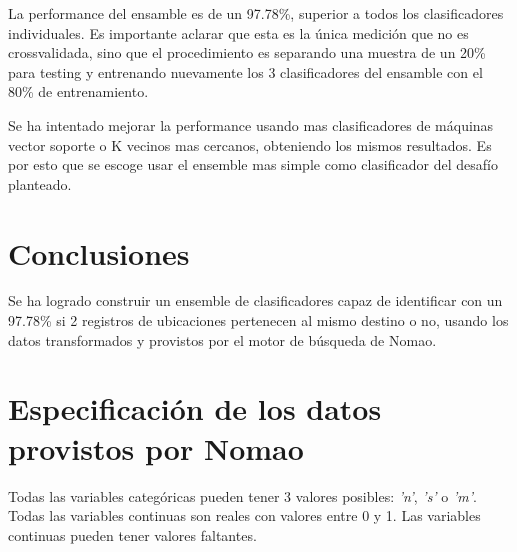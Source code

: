 \documentclass[journal]{IEEEtran}
\begin{document}
La performance del ensamble es de un 97.78\%, superior a todos los
clasificadores individuales. Es importante aclarar
que esta es la única medición que no es crossvalidada, sino que el 
procedimiento es separando una muestra de un 20\% para testing y
entrenando nuevamente los 3 clasificadores del ensamble con el 80\%
de entrenamiento.

Se ha intentado mejorar la performance usando mas clasificadores de
máquinas vector soporte o K vecinos mas cercanos, obteniendo los
mismos resultados. Es por esto que se escoge usar el ensemble
mas simple como clasificador del desafío planteado.


\section{Conclusiones}
Se ha logrado construir un ensemble de clasificadores capaz de identificar
con un 97.78\% si 2 registros de ubicaciones pertenecen al mismo destino o no,
usando los datos transformados y provistos por el motor de búsqueda de Nomao.



\appendices

\section{Especificación de los datos provistos por Nomao}
\label{appendix1}
Todas las variables categóricas pueden tener 3 valores posibles:
\textit{'n'}, \textit{'s'} o \textit{'m'}.
Todas las variables continuas son reales con valores entre 
0 y 1. Las variables continuas pueden tener valores faltantes.
\end{document}
